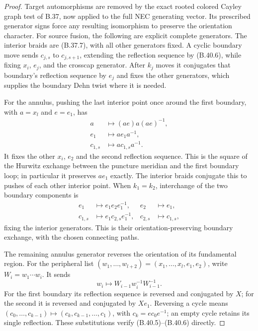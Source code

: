 \begin{proof}
Target automorphisms are removed by the exact rooted colored Cayley
graph test of B.37, now applied to the full NEC generating vector.
Its prescribed generator signs force any resulting isomorphism to
preserve the orientation character.  For source fusion, the following
are explicit complete generators.  The interior braids are
(B.37.7), with all other generators fixed.  A cyclic boundary move
sends $c_{j,s}$ to $c_{j,s+1}$, extending the reflection sequence
by (B.40.6), while fixing $x_i$, $e_j$, and the crosscap generator.
After $k_j$ moves it conjugates that boundary's reflection sequence
by $e_j$ and fixes the other generators, which supplies the boundary
Dehn twist where it is needed.

For the annulus, pushing the last interior point once around the
first boundary, with $a=x_l$ and $e=e_1$, has
\[
 \begin{aligned}
 a&\longmapsto (a e)a(a e)^{-1},\\
 e_1&\longmapsto a e_1a^{-1},\\
 c_{1,s}&\longmapsto a c_{1,s}a^{-1}.
 \end{aligned}                                           \tag{B.40.8}
\]
It fixes the other $x_i$, $e_2$ and the second reflection sequence.
This is the square of the Hurwitz exchange between the puncture
meridian and the first boundary loop; in particular it preserves
$a e_1$ exactly.  The interior braids conjugate this to pushes of
each other interior point.  When $k_1=k_2$, interchange of the two
boundary components is
\[
 \begin{aligned}
 e_1&\longmapsto e_1e_2e_1^{-1},&
 e_2&\longmapsto e_1,\\
 c_{1,s}&\longmapsto e_1c_{2,s}e_1^{-1},&
 c_{2,s}&\longmapsto c_{1,s},
 \end{aligned}                                           \tag{B.40.9}
\]
fixing the interior generators.  This is their orientation-preserving
boundary exchange, with the chosen connecting paths.

The remaining annulus generator reverses the orientation of its
fundamental region.  For the peripheral list
$(w_1,\ldots,w_{l+2})=(x_1,\ldots,x_l,e_1,e_2)$, write
$W_i=w_1\cdots w_i$.  It sends
\[
             w_i\longmapsto W_{i-1}w_i^{-1}W_{i-1}^{-1}.
                                                        \tag{B.40.10}
\]
For the first boundary its reflection sequence is reversed and
conjugated by $X$; for the second it is reversed and conjugated by
$X e_1$.  Reversing a cycle means
$(c_0,\ldots,c_{k-1})\mapsto(c_k,c_{k-1},\ldots,c_1)$,
with $c_k=e c_0e^{-1}$; an empty cycle retains its single reflection.
These substitutions verify (B.40.5)--(B.40.6) directly.


\end{proof}
